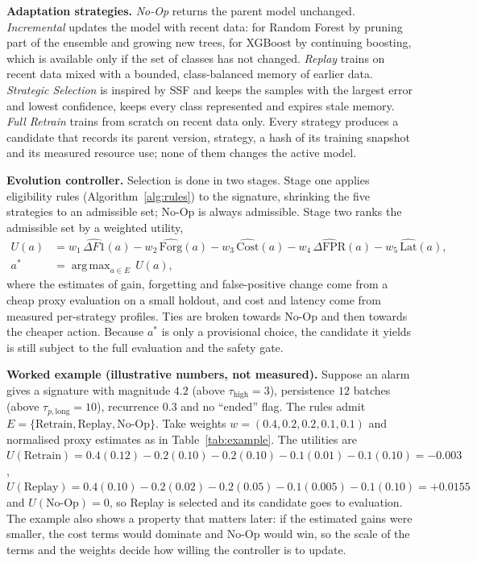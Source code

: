 \documentclass{article}
\DeclareMathOperator*{\argmax}{arg\,max}
\begin{document}
\textbf{Adaptation strategies.} \emph{No-Op} returns the parent model unchanged. \emph{Incremental} updates the model with recent data: for Random Forest \cite{breiman2001rf} by pruning part of the ensemble and growing new trees, for XGBoost \cite{chen2016xgboost} by continuing boosting, which is available only if the set of classes has not changed. \emph{Replay} trains on recent data mixed with a bounded, class-balanced memory of earlier data. \emph{Strategic Selection} is inspired by SSF and keeps the samples with the largest error and lowest confidence, keeps every class represented and expires stale memory. \emph{Full Retrain} trains from scratch on recent data only. Every strategy produces a candidate that records its parent version, strategy, a hash of its training snapshot and its measured resource use; none of them changes the active model.

\textbf{Evolution controller.} Selection is done in two stages. Stage one applies eligibility rules (Algorithm~\ref{alg:rules}) to the signature, shrinking the five strategies to an admissible set; No-Op is always admissible. Stage two ranks the admissible set by a weighted utility,
\begin{align}
U(a)&=w_1\,\widehat{\Delta F1}(a)-w_2\,\widehat{\text{Forg}}(a)-w_3\,\widehat{\text{Cost}}(a)-w_4\,\widehat{\Delta\text{FPR}}(a)-w_5\,\widehat{\text{Lat}}(a),\label{eq:utility}\\
a^{*}&=\argmax_{a\in E}\,U(a),
\end{align}
where the estimates of gain, forgetting and false-positive change come from a cheap proxy evaluation on a small holdout, and cost and latency come from measured per-strategy profiles. Ties are broken towards No-Op and then towards the cheaper action. Because $a^{*}$ is only a provisional choice, the candidate it yields is still subject to the full evaluation and the safety gate.

\textbf{Worked example (illustrative numbers, not measured).} Suppose an alarm gives a signature with magnitude $4.2$ (above $\tau_{\text{high}}=3$), persistence $12$ batches (above $\tau_{p,\text{long}}=10$), recurrence $0.3$ and no ``ended'' flag. The rules admit $E=\{\text{Retrain},\text{Replay},\text{No-Op}\}$. Take weights $w=(0.4,0.2,0.2,0.1,0.1)$ and normalised proxy estimates as in Table~\ref{tab:example}. The utilities are $U(\text{Retrain})=0.4(0.12)-0.2(0.10)-0.2(0.10)-0.1(0.01)-0.1(0.10)=-0.003$, $U(\text{Replay})=0.4(0.10)-0.2(0.02)-0.2(0.05)-0.1(0.005)-0.1(0.10)=+0.0155$ and $U(\text{No-Op})=0$, so Replay is selected and its candidate goes to evaluation. The example also shows a property that matters later: if the estimated gains were smaller, the cost terms would dominate and No-Op would win, so the scale of the terms and the weights decide how willing the controller is to update.
\end{document}
